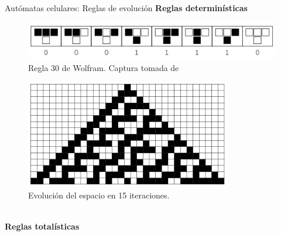 \documentclass[9pt]{beamer}
\begin{document}
\begin{frame}{Autómatas celulares: Reglas de evolución}
\textbf{Reglas determinísticas}\\
\begin{minipage}{0.65\textwidth}
\begin{figure}[h]
  \centering
    \includegraphics[width=1\textwidth]{Imagenes/regla30.PNG}
  \caption{Regla 30 de Wolfram. Captura tomada de \cite{rule30}}
  \label{fig:Regla30}
\end{figure}
\end{minipage}
\hfill
\begin{minipage}{0.3\textwidth}
\begin{figure}[h]
  \centering
    \includegraphics[width=0.8\textwidth]{Imagenes/regla30en15.PNG}
  \caption{Evolución del espacio en 15 iteraciones.}
  \label{fig:Regla30}
\end{figure}
\end{minipage}\\

\textbf{Reglas totalísticas}
    
    
    

\end{frame}
\end{document}
